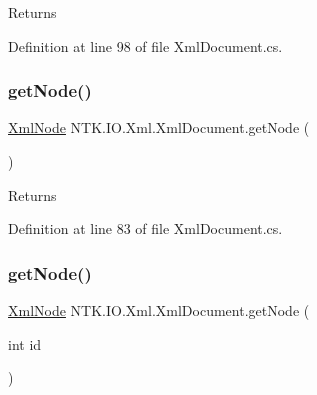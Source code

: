 \begin{DoxyReturn}{Returns}

\end{DoxyReturn}


Definition at line 98 of file Xml\+Document.\+cs.

\mbox{\label{class_n_t_k_1_1_i_o_1_1_xml_1_1_xml_document_accfdd41b8ec76935fc78769a0350a032}} 
\subsubsection{\texorpdfstring{getNode()}{getNode()}\hspace{0.1cm}{\footnotesize\ttfamily [1/3]}}
{\footnotesize\ttfamily \mbox{\hyperlink{class_n_t_k_1_1_i_o_1_1_xml_1_1_xml_node}{Xml\+Node}} N\+T\+K.\+I\+O.\+Xml.\+Xml\+Document.\+get\+Node (\begin{DoxyParamCaption}{ }\end{DoxyParamCaption})}





\begin{DoxyReturn}{Returns}

\end{DoxyReturn}


Definition at line 83 of file Xml\+Document.\+cs.

\mbox{\label{class_n_t_k_1_1_i_o_1_1_xml_1_1_xml_document_ac7b2b82c1e6c129f22381f99a72a175d}} 
\subsubsection{\texorpdfstring{getNode()}{getNode()}\hspace{0.1cm}{\footnotesize\ttfamily [2/3]}}
{\footnotesize\ttfamily \mbox{\hyperlink{class_n_t_k_1_1_i_o_1_1_xml_1_1_xml_node}{Xml\+Node}} N\+T\+K.\+I\+O.\+Xml.\+Xml\+Document.\+get\+Node (\begin{DoxyParamCaption}\item[{int}]{id }\end{DoxyParamCaption})}






